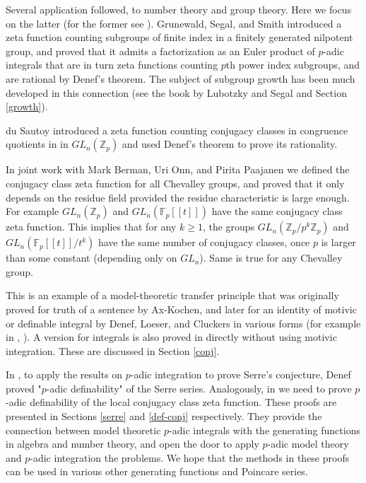 \documentclass[12pt]{amsart}
\def\F{\mathbb{F}}
\def\Z{\mathbb{Z}}
\def\F{\mathbb{F}}
\numberwithin{equation}{section}
\begin{document}
Several application followed, to number theory and group theory. Here we focus on the latter (for the former see \cite{adeles-surv}). Grunewald, Segal, and Smith \cite{GSS} introduced a zeta function counting subgroups of finite index in a finitely generated nilpotent group, and proved that it admits a factorization as an Euler product of $p$-adic integrals that are in turn zeta functions counting $p$th power index subgroups, and are rational by Denef's theorem. The subject of subgroup growth 
has been much developed in this connection (see the book by Lubotzky and Segal \cite{alex-dan-book} and Section \ref{growth}).

du Sautoy introduced a zeta function counting conjugacy classes in congruence quotients in in $GL_n(\Z_p)$ 
and used Denef's theorem to prove its rationality.

In joint work with Mark Berman, Uri Onn, and Pirita Paajanen \cite{BDOP} we defined the conjugacy class zeta function for all Chevalley groups, and proved that it only depends on the residue field provided the residue characteristic is large enough. 
For example $GL_n(\Z_p)$ and $GL_n(\F_p[[t]])$ have the same conjugacy class zeta function. This implies that 
for any $k\geq 1$, the groups $GL_n(\Z_p/p^k\Z_p)$ and $GL_n(\F_p[[t]]/t^k)$ have the same number of conjugacy classes, once $p$ is larger than some constant (depending only on $GL_n$). Same is true for any Chevalley group. 

This is an example of a model-theoretic transfer principle that was originally proved for truth of a sentence by Ax-Kochen, and later for an identity of motivic or definable integral by Denef, Loeser, and Cluckers in various forms (for example in \cite{DL}, \cite{CL2}). A version for integrals is also proved in \cite{BDOP} directly without using motivic integration. These are discussed in Section \ref{conj}.

In \cite{Denefrationality}, to apply the results on $p$-adic integration to prove Serre's conjecture, 
Denef proved "$p$-adic definability" of the Serre series. Analogously, in \cite{BDOP} we need to prove $p$-adic 
definability of the local conjugacy class zeta function. These proofs are presented in Sections \ref{serre} and \ref{def-conj} respectively. They provide the connection between model theoretic $p$-adic integrals with the generating functions in algebra and number theory, and open the door to apply $p$-adic model theory and $p$-adic integration the problems. We hope that the methods in these proofs can be used in various other generating functions and Poincare series. 
\end{document}
